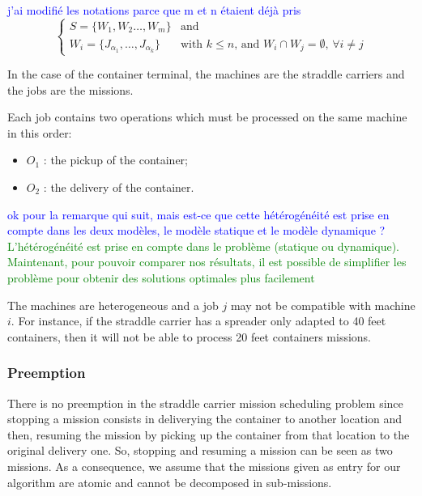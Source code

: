 \documentclass[a4paper,10pt]{article}
\begin{document}
\textcolor{blue}{j'ai modifié les notations parce que m et n étaient déjà pris}
\begin{equation*}
\begin{cases}
 S = \{ W_{1} , W_{2} \ldots , W_{m}\} & \text{and}\\
 W_{i} = \{ J_{\alpha_1} , \ldots , J_{\alpha_k} \} & \text{with $k \leq n$, and $W_{i} \cap W_{j} = \emptyset$,  $\forall i \neq j$} 
\end{cases}
\end{equation*}

In the case of the container terminal, the machines are the straddle carriers and the jobs are the missions.
 
Each job contains two operations which must be processed on the same machine in this order:
\begin{itemize}
 \item $O_1$ : the pickup of the container;
 \item $O_2$ : the delivery of the container.
\end{itemize}

\textcolor{blue}{ok pour la remarque qui suit, mais est-ce que cette hétérogénéité est prise en compte dans les deux modèles, le modèle statique et le modèle dynamique ?} \\
\textcolor{green}{L'hétérogénéité est prise en compte dans le problème (statique ou dynamique). Maintenant, pour pouvoir comparer nos résultats, il est possible de simplifier les problème pour obtenir des solutions optimales plus facilement}

The machines are heterogeneous and a job $j$ may not be compatible with machine $i$. For instance, if the straddle carrier has a spreader only adapted to 40 feet containers, then it will not be able to process 20 feet containers missions.

\subsubsection{Preemption}
There is no preemption in the straddle carrier mission scheduling problem since stopping a mission consists in deliverying the container to another location and then, resuming the mission by picking up the container from that location to the original delivery one. So, stopping and resuming a mission can be seen as two missions. As a consequence, we assume that the missions given as entry for our algorithm are atomic and cannot be decomposed in sub-missions.
\end{document}
